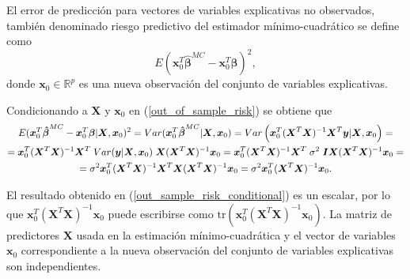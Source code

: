 \documentclass[a4paper,12pt]{report}
\begin{document}
El error de predicción para vectores de variables explicativas no observados, también denominado riesgo predictivo del estimador mínimo-cuadrático se define como
\begin{equation}
\label{out_of_sample_risk}
E(\boldsymbol{x}_0^T\boldsymbol{\hat{\beta}}^{MC}-\boldsymbol{x}_0^T\boldsymbol{\beta})^2,
\end{equation}
donde $\boldsymbol{x}_0 \in \mathbb{R}^p$ es una nueva observación del conjunto de variables explicativas.

Condicionando a $\boldsymbol{X}$ y $\boldsymbol{x}_0$ en (\ref{out_of_sample_risk}) se obtiene que
\begin{gather}
\nonumber
E(\boldsymbol{x}_0^T\boldsymbol{\hat{\beta}}^{MC}-\boldsymbol{x}_0^T\boldsymbol{\beta}|\boldsymbol{X},\boldsymbol{x}_0)^2 = 
Var(\boldsymbol{x}_0^T\boldsymbol{\hat{\beta}}^{MC}|\boldsymbol{X},\boldsymbol{x}_0) =
Var\left(\boldsymbol{x}_0^T(\boldsymbol{X}^T\boldsymbol{X})^{-1}\boldsymbol{X}^T\boldsymbol{y}|\boldsymbol{X},\boldsymbol{x}_0\right) = \\
\nonumber
=\boldsymbol{x}_0^T(\boldsymbol{X}^T\boldsymbol{X})^{-1}\boldsymbol{X}^T \hspace{0.1cm} Var(\boldsymbol{y}|\boldsymbol{X},\boldsymbol{x}_0) \hspace{0.1cm} \boldsymbol{X}(\boldsymbol{X}^T\boldsymbol{X})^{-1}\boldsymbol{x}_0 =
\boldsymbol{x}_0^T(\boldsymbol{X}^T\boldsymbol{X})^{-1}\boldsymbol{X}^T \hspace{0.1cm} \sigma^2 \hspace{0.1cm} \boldsymbol{I}\boldsymbol{X}(\boldsymbol{X}^T\boldsymbol{X})^{-1}\boldsymbol{x}_0 = \\
\label{out_sample_risk_conditional}
=\sigma^2\boldsymbol{x}_0^T(\boldsymbol{X}^T\boldsymbol{X})^{-1}\boldsymbol{X}^T\boldsymbol{X}(\boldsymbol{X}^T\boldsymbol{X})^{-1}\boldsymbol{x}_0 =\sigma^2\boldsymbol{x}_0^T(\boldsymbol{X}^T\boldsymbol{X})^{-1}\boldsymbol{x}_0.
\end{gather}

El resultado obtenido en (\ref{out_sample_risk_conditional}) es un escalar, por lo que $\boldsymbol{x}_0^T(\boldsymbol{X}^T\boldsymbol{X})^{-1}\boldsymbol{x}_0$ puede escribirse como $\text{tr}(\boldsymbol{x}_0^T(\boldsymbol{X}^T\boldsymbol{X})^{-1}\boldsymbol{x}_0)$. La matriz de predictores $\boldsymbol{X}$ usada en la estimación mínimo-cuadrática y el vector de variables $\boldsymbol{x}_0$ correspondiente a la nueva observación del conjunto de variables explicativas son independientes. 
\end{document}
